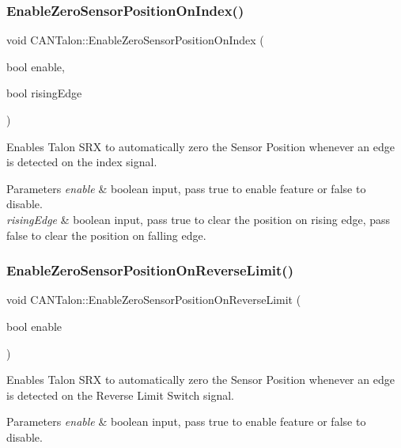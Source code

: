 \subsubsection{\texorpdfstring{Enable\+Zero\+Sensor\+Position\+On\+Index()}{EnableZeroSensorPositionOnIndex()}}
{\footnotesize\ttfamily void C\+A\+N\+Talon\+::\+Enable\+Zero\+Sensor\+Position\+On\+Index (\begin{DoxyParamCaption}\item[{bool}]{enable,  }\item[{bool}]{rising\+Edge }\end{DoxyParamCaption})}

Enables Talon S\+RX to automatically zero the Sensor Position whenever an edge is detected on the index signal.


\begin{DoxyParams}{Parameters}
{\em enable} & boolean input, pass true to enable feature or false to disable. \\
\hline
{\em rising\+Edge} & boolean input, pass true to clear the position on rising edge, pass false to clear the position on falling edge. \\
\hline
\end{DoxyParams}
\mbox{\label{class_c_a_n_talon_af21066f2a72e47bcce1640f22ed419f0}} 
\subsubsection{\texorpdfstring{Enable\+Zero\+Sensor\+Position\+On\+Reverse\+Limit()}{EnableZeroSensorPositionOnReverseLimit()}}
{\footnotesize\ttfamily void C\+A\+N\+Talon\+::\+Enable\+Zero\+Sensor\+Position\+On\+Reverse\+Limit (\begin{DoxyParamCaption}\item[{bool}]{enable }\end{DoxyParamCaption})}

Enables Talon S\+RX to automatically zero the Sensor Position whenever an edge is detected on the Reverse Limit Switch signal.


\begin{DoxyParams}{Parameters}
{\em enable} & boolean input, pass true to enable feature or false to disable. \\
\hline
\end{DoxyParams}
\mbox{\label{class_c_a_n_talon_a6819f1eae4eefb39c441a3b8e973613d}} 
